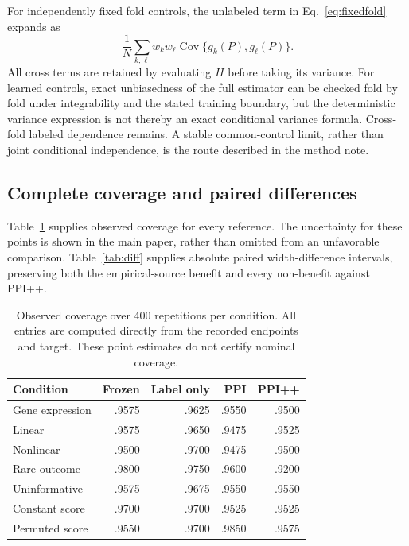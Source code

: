 \documentclass{article}
\newcommand{\Cov}{\operatorname{Cov}}
\begin{document}
For independently fixed fold controls, the unlabeled term in Eq.~\eqref{eq:fixedfold} expands as
\[
 \frac1N\sum_{k,\ell}w_kw_\ell\Cov\{g_k(P),g_\ell(P)\}.
\]
All cross terms are retained by evaluating $H$ before taking its variance. For learned controls, exact unbiasedness of the full estimator can be checked fold by fold under integrability and the stated training boundary, but the deterministic variance expression is not thereby an exact conditional variance formula. Cross-fold labeled dependence remains. A stable common-control limit, rather than joint conditional independence, is the route described in the method note.

\subsection{Complete coverage and paired differences}
Table~\ref{tab:coverage} supplies observed coverage for every reference. The uncertainty for these points is shown in the main paper, rather than omitted from an unfavorable comparison. Table~\ref{tab:diff} supplies absolute paired width-difference intervals, preserving both the empirical-source benefit and every non-benefit against PPI++.

\begin{table}[h]
\centering
\caption{Observed coverage over 400 repetitions per condition. All entries are computed directly from the recorded endpoints and target. These point estimates do not certify nominal coverage.}
\label{tab:coverage}
\begin{tabular}{lrrrr}
\toprule
Condition & Frozen & Label only & PPI & PPI++\\
\midrule
Gene expression & .9575 & .9625 & .9550 & .9500\\
Linear & .9575 & .9650 & .9475 & .9525\\
Nonlinear & .9500 & .9700 & .9475 & .9500\\
Rare outcome & .9800 & .9750 & .9600 & .9200\\
Uninformative & .9575 & .9675 & .9550 & .9550\\
Constant score & .9700 & .9700 & .9525 & .9525\\
Permuted score & .9550 & .9700 & .9850 & .9575\\
\bottomrule
\end{tabular}
\end{table}
\end{document}

